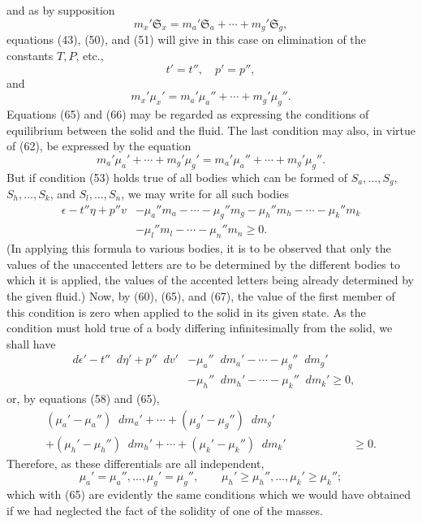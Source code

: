\documentclass[11pt]{article}
\newcommand{\dd}{\mathop{}\!d}
\newcommand{\unit}[1]{\mathfrak{S}_{#1}}
\begin{document}
and as by supposition
\begin{equation}
m_x'\unit{x}=m_a'\unit{a}+\cdots+m_g'\unit{g},
\end{equation}
equations (43), (50), and (51) will give in this case on elimination of the constants \(T,P\), etc.,
\begin{equation}
t'=t'',\quad p'=p'',
\end{equation}
and
\begin{equation}
m_x'\mu_x'=m_a'\mu_a''+\cdots+m_g'\mu_g''.
\end{equation}
Equations (65) and (66) may be regarded as expressing the conditions of equilibrium between the solid and the fluid. The last condition may also, in virtue of (62), be expressed by the equation
\begin{equation}
m_a'\mu_a'+\cdots+m_g'\mu_g'=m_a'\mu_a''+\cdots+m_g'\mu_g''.
\end{equation}
But if condition (53) holds true of all bodies which can be formed of \(S_a,\ldots,S_g\), \(S_h,\ldots,S_k\), and \(S_l,\ldots,S_n\), we may write for all such bodies
\begin{equation}
\begin{aligned}
\epsilon-t''\eta+p''v
&-\mu_a''m_a-\cdots-\mu_g''m_g
-\mu_h''m_h-\cdots-\mu_k''m_k\\
&-\mu_l''m_l-\cdots-\mu_n''m_n\geq 0.
\end{aligned}
\end{equation}
(In applying this formula to various bodies, it is to be observed that only the values of the unaccented letters are to be determined by the different bodies to which it is applied, the values of the accented letters being already determined by the given fluid.) Now, by (60), (65), and (67), the value of the first member of this condition is zero when applied to the solid in its given state. As the condition must hold true of a body differing infinitesimally from the solid, we shall have
\begin{equation}
\begin{aligned}
\dd\epsilon'-t''\dd\eta'+p''\dd v'
&-\mu_a''\dd m_a'-\cdots-\mu_g''\dd m_g'\\
&-\mu_h''\dd m_h'-\cdots-\mu_k''\dd m_k'\geq 0,
\end{aligned}
\end{equation}
or, by equations (58) and (65),
\begin{equation}
\begin{aligned}
(\mu_a'-\mu_a'')\dd m_a'+\cdots+(\mu_g'-\mu_g'')\dd m_g'\qquad\qquad\qquad{}&\\
+(\mu_h'-\mu_h'')\dd m_h'+\cdots+(\mu_k'-\mu_k'')\dd m_k'&\geq 0.
\end{aligned}
\end{equation}
Therefore, as these differentials are all independent,
\begin{equation}
\mu_a'=\mu_a'',\ldots,\mu_g'=\mu_g'',\qquad
\mu_h'\geq\mu_h'',\ldots,\mu_k'\geq\mu_k'';
\end{equation}
which with (65) are evidently the same conditions which we would have obtained if we had neglected the fact of the solidity of one of the masses.
\end{document}
